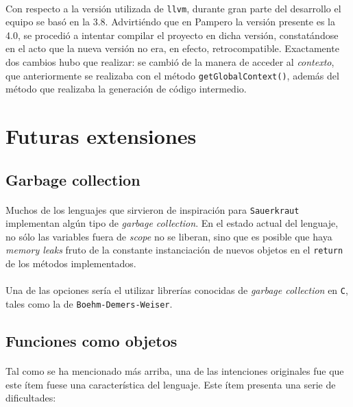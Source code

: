 \documentclass[12pt]{article}
\begin{document}
	\paragraph{} Con respecto a la versión utilizada de \verb|llvm|, durante gran parte del desarrollo el equipo se basó en la 3.8. Advirtiéndo que en Pampero la versión presente es la 4.0, se procedió a intentar compilar el proyecto en dicha versión, constatándose en el acto que la nueva versión no era, en efecto,  retrocompatible. Exactamente dos cambios hubo que realizar: se cambió de la manera de acceder al \textit{contexto}, que anteriormente se realizaba con el método \verb|getGlobalContext()|, además del método que realizaba la generación de código intermedio.
	
	\section{Futuras extensiones}
	
	\subsection{Garbage collection}
	
	\paragraph{} Muchos de los lenguajes que sirvieron de inspiración para \verb|Sauerkraut| implementan algún tipo de \textit{garbage collection}. En el estado actual del lenguaje, no sólo las variables fuera de \textit{scope} no se liberan, sino que es posible que haya \textit{memory leaks} fruto de la constante instanciación de nuevos objetos en el \verb|return| de los métodos implementados.
	
	\paragraph{} Una de las opciones sería el utilizar librerías conocidas de \textit{garbage collection} en \verb|C|, tales como la de \verb|Boehm-Demers-Weiser|.
	
	\subsection{Funciones como objetos}
	
	\paragraph{} Tal como se ha mencionado más arriba, una de las intenciones originales fue que este ítem fuese una característica del lenguaje. Este ítem presenta una serie de dificultades: 
	
\end{document}
